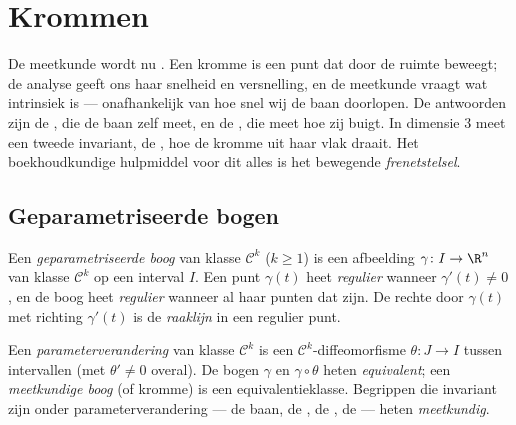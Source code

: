 \chapter{Krommen}\label{ch:b2:curves}

De meetkunde wordt nu . Een kromme is een punt dat
door de ruimte beweegt; de analyse geeft ons haar snelheid en
versnelling, en de meetkunde vraagt wat intrinsiek is ---
onafhankelijk van hoe snel wij de baan doorlopen. De antwoorden
zijn de \emph{}, die de baan zelf meet, en de
\emph{}, die meet hoe zij buigt. In dimensie $3$ meet een
tweede invariant, de \emph{}, hoe de kromme uit haar vlak
draait. Het boekhoudkundige hulpmiddel voor dit alles is het
bewegende \emph{frenetstelsel}.

\section{Geparametriseerde bogen}

\begin{definition}\label{def:b2:curves:arc}
Een \emph{geparametriseerde boog} van
klasse $\mathcal{C}^k$ ($k \geq 1$) is een afbeelding $\gamma
\colon I \to \R^n$ van klasse $\mathcal{C}^k$ op een interval $I$.
Een punt $\gamma(t)$ heet \emph{regulier} wanneer $\gamma'(t) \neq
0$, en de boog heet \emph{regulier} wanneer al haar punten dat
zijn. De rechte door $\gamma(t)$ met richting $\gamma'(t)$ is de
\emph{raaklijn} in een regulier punt.
\end{definition}

\begin{definition}[Parameterverandering]\label{def:b2:curves:reparam}
Een \emph{parameterverandering} van
klasse $\mathcal{C}^k$ is een $\mathcal{C}^k$-diffeomorfisme
$\theta \colon J \to I$ tussen intervallen (met $\theta' \neq 0$
overal). De bogen $\gamma$ en $\gamma \circ \theta$ heten
\emph{equivalent}; een \emph{meetkundige boog} (of kromme) is een equivalentieklasse. Begrippen die
invariant zijn onder parameterverandering --- de baan, de ,
de , de  --- heten \emph{meetkundig}.
\end{definition}

